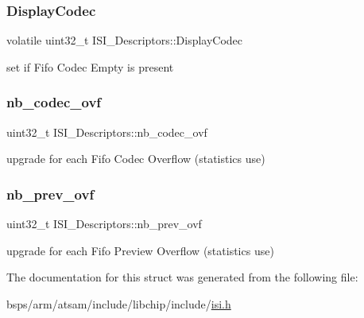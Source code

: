 \subsubsection{\texorpdfstring{DisplayCodec}{DisplayCodec}}
{\footnotesize\ttfamily volatile uint32\+\_\+t I\+S\+I\+\_\+\+Descriptors\+::\+Display\+Codec}

set if Fifo Codec Empty is present \mbox{\label{structISI__Descriptors_a811f73460a418af9a5a1e44524bf9676}} 
\subsubsection{\texorpdfstring{nb\_codec\_ovf}{nb\_codec\_ovf}}
{\footnotesize\ttfamily uint32\+\_\+t I\+S\+I\+\_\+\+Descriptors\+::nb\+\_\+codec\+\_\+ovf}

upgrade for each Fifo Codec Overflow (statistics use) \mbox{\label{structISI__Descriptors_a9c3303b2f3ea7e27763c432aa16a9c5a}} 
\subsubsection{\texorpdfstring{nb\_prev\_ovf}{nb\_prev\_ovf}}
{\footnotesize\ttfamily uint32\+\_\+t I\+S\+I\+\_\+\+Descriptors\+::nb\+\_\+prev\+\_\+ovf}

upgrade for each Fifo Preview Overflow (statistics use) 

The documentation for this struct was generated from the following file\+:\begin{DoxyCompactItemize}
\item 
bsps/arm/atsam/include/libchip/include/\mbox{\hyperlink{isi_8h}{isi.\+h}}\end{DoxyCompactItemize}
